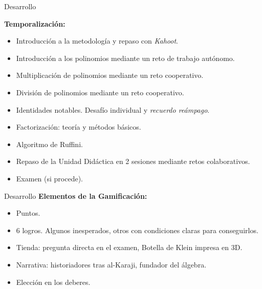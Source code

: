 \documentclass[10pt,notes,compress,usetitleprogressbar,aspectratio=1610]{beamer}
\begin{document}
\begin{frame}{Desarrollo}

\textbf{Temporalización:}
\begin{itemize}
	\item<1-> Introducción a la metodología y repaso con \textit{Kahoot}.
	\item<2-> Introducción a los polinomios mediante un reto de trabajo autónomo.
	\item<3-> Multiplicación de polinomios mediante un reto cooperativo.
	\item<4-> División de polinomios mediante un reto cooperativo.
	\item<5-> Identidades notables. Desafío individual y \textit{recuerdo re\'ampago}.
	\item<6-> Factorización: teoría y métodos básicos.
	\item<7-> Algoritmo de Ruffini.
	\item<8-> Repaso de la Unidad Didáctica en 2 sesiones mediante retos colaborativos.
	\item<9-> Examen (si procede).
\end{itemize}
\end{frame}


\begin{frame}{Desarrollo}
\textbf{Elementos de la Gamificación:}
\begin{itemize}
	\item Puntos.
	\item 6 logros. Algunos inesperados, otros con condiciones claras para conseguirlos.
	\item Tienda: pregunta directa en el examen, Botella de Klein impresa en 3D.
	\item Narrativa: historiadores tras al-Karaji, fundador del álgebra.
	\item Elección en los deberes.
\end{itemize}

\end{frame}
\end{document}
